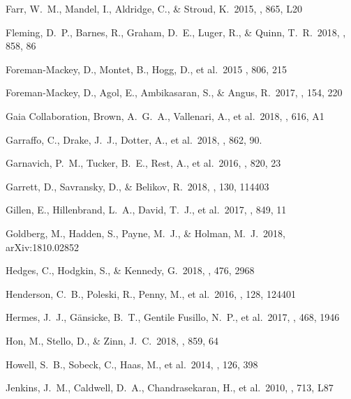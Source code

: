 \documentclass[modern]{aastex62}
\begin{document}
\begin{thebibliography}{}
 Farr, W.~M., Mandel, I., Aldridge, C., \& Stroud, K.\ 2015, \apjl, 865, L20 

 Fleming, D.~P., Barnes, R., Graham, D.~E., Luger, R., \& Quinn, T.~R.\ 2018, \apj, 858, 86 

 Foreman-Mackey, D., Montet, B., Hogg, D., et al.\ 2015 \apj, 806, 215

 Foreman-Mackey, D., Agol, E., Ambikasaran, S., \& Angus, R.\ 2017, \aj, 154, 220 

 Gaia Collaboration, Brown, A.~G.~A., Vallenari, A., et al.\ 2018, \aap, 616, A1 

 Garraffo, C., Drake, J.~J., Dotter, A., et al.\ 2018, \apj, 862, 90.

 Garnavich, P.~M., Tucker, B.~E., Rest, A., et al.\ 2016, \apj, 820, 23 

 Garrett, D., Savransky, D., \& Belikov, R.\ 2018, \pasp, 130, 114403 

 Gillen, E., Hillenbrand, L.~A., David, T.~J., et al.\ 2017, \apj, 849, 11 

 Goldberg, M., Hadden, S., Payne, M.~J., \& Holman, M.~J.\ 2018, arXiv:1810.02852 

 Hedges, C., Hodgkin, S., \& Kennedy, G.\ 2018, \mnras, 476, 2968 

 Henderson, C.~B., Poleski, R., Penny, M., et al.\ 2016, \pasp, 128, 124401 

 Hermes, J.~J., G{\"a}nsicke, B.~T., Gentile Fusillo, N.~P., et al.\ 2017, \mnras, 468, 1946 

 Hon, M., Stello, D., \& Zinn, J.~C.\ 2018, \apj, 859, 64 

 Howell, S.~B., Sobeck, C., Haas, M., et al.\ 2014, \pasp, 126, 398 

 Jenkins, J.~M., Caldwell, D.~A., Chandrasekaran, H., et al.\ 2010, \apjl, 713, L87 


\end{thebibliography}
\end{document}
